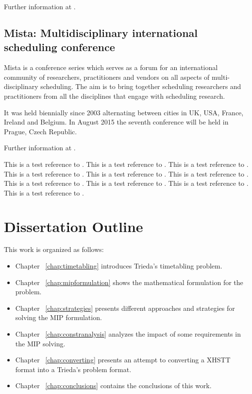 Further information at \cite{Watt}.


\subsection{Mista: Multidisciplinary international scheduling conference}
\label{mista}

Mista is a conference series which serves as a forum for an international community of researchers, practitioners and vendors on all aspects of multi-disciplinary scheduling. The aim is to bring together scheduling researchers and practitioners from all the disciplines that engage with scheduling research. 

It was held biennially since 2003 alternating between cities in UK, USA, France, Ireland and Belgium. In August 2015 the seventh conference will be held in Prague, Czech Republic.

Further information at \cite{Mista}.


This is a test reference to \cite{Carter2001}.    %
This is a test reference to \cite{Murray2007}.    %
This is a test reference to \cite{Unitime}.       %
This is a test reference to \cite{DSS}.           %
This is a test reference to \cite{Guenalay2006}.  %
This is a test reference to \cite{Schaerf99}.  		%
This is a test reference to \cite{Michael2002}.   %
This is a test reference to \cite{SchoolOverview2010}.   %
This is a test reference to \cite{Birbas2009}.    %
This is a test reference to \cite{Mimosasoftware}.





\section{Dissertation Outline}
This work is organized as follows: 
\begin{itemize}
	\item Chapter ~\ref{chap:timetabling} introduces Trieda's timetabling problem.
	\item Chapter ~\ref{chap:mipformulation} shows the mathematical formulation for the problem.
	\item Chapter ~\ref{chap:strategies} presents different approaches and strategies for solving the MIP formulation.
	\item Chapter ~\ref{chap:constranalysis} analyzes the impact of some requirements in the MIP solving.
	\item Chapter ~\ref{chap:converting} presents an attempt to converting a XHSTT format into a Trieda's problem format.
	\item Chapter ~\ref{chap:conclusions} contains the conclusions of this work.
\end{itemize}